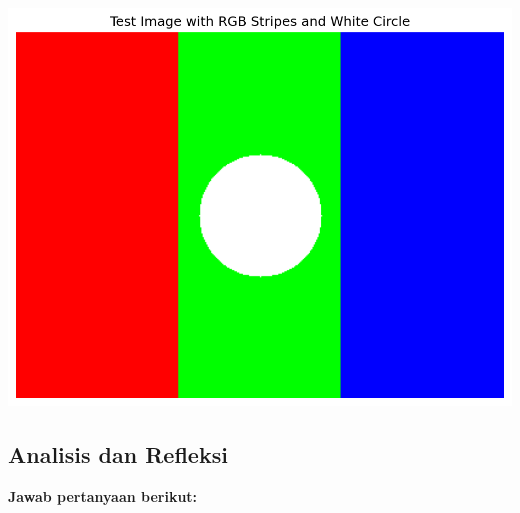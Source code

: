 \documentclass[11pt,a4paper]{article}
\begin{document}
\begin{itemize}
\begin{center}
	\includegraphics[scale = 0.5]{Figure/test_image.png}
    \end{center}
    \end{itemize}
    
\subsection{Analisis dan Refleksi}
\textbf{Jawab pertanyaan berikut:}
\end{document}
